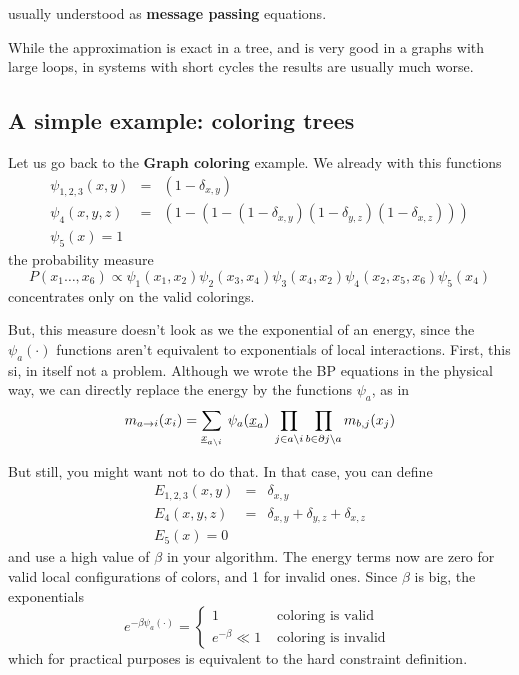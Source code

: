 usually understood as {\bf message passing} equations.

While the approximation is exact in a tree, and is very good in a graphs with large loops, in systems with short cycles the results are usually much worse.


\subsection{A simple example: coloring trees}
Let us go back to the  {\bf Graph coloring} example. We already with this functions
\begin{eqnarray*}
\psi_{1,2,3}(x,y) &=& (1-\delta_{x,y}) \\
\psi_{4}(x,y,z) &=& (1-(1- (1-\delta_{x,y})(1-\delta_{y,z})(1-\delta_{x,z}))) \\
\psi_5(x) = 1
\end{eqnarray*}
 the probability measure
\[ P(x_1\ldots,x_6) \propto  \psi_1(x_1, x_2) \psi_2(x_3, x_4) \psi_3(x_4, x_2) \psi_4(x_2, x_5,x_6) \psi_5(x_4)\]
concentrates only on the  valid colorings.

But, this measure doesn't look as we the exponential of an energy, since the $\psi_a(\cdot)$ functions aren't equivalent to exponentials of local interactions. First, this si, in itself not a problem. Although we wrote the BP equations in the physical way, we can directly replace the energy by the functions $\psi_a$, as in \begin{equation}
 m_{a\to i}(x_i) = \sum_{\underline{x}_{a \setminus i}} \: \psi_a(\underline{x}_a) \: \prod_{j\in a \setminus i} \prod_{b \in \partial j \setminus a} m_{b,j}(x_j)
\end{equation}

But still, you might want not to do that. In that case, you can define
\begin{eqnarray*}
E_{1,2,3}(x,y) &=& \delta_{x,y} \\
E_{4}(x,y,z) &=& \delta_{x,y} +  \delta_{y,z} + \delta_{x,z} \\
E_5(x) = 0
\end{eqnarray*}
and use a high value of $\beta$ in your algorithm.  The energy terms now are zero for valid local configurations of colors, and 1 for invalid ones. Since $\beta$ is big, the exponentials
\[ e^{-\beta \psi_a(\cdot)} = \left\{ \begin{array}{ll}
1 & \mbox{ coloring is valid } \\
e^{-\beta} \ll 1 & \mbox{ coloring is invalid }
\end{array} \right.
\]
which for practical purposes is equivalent to the hard constraint definition.



